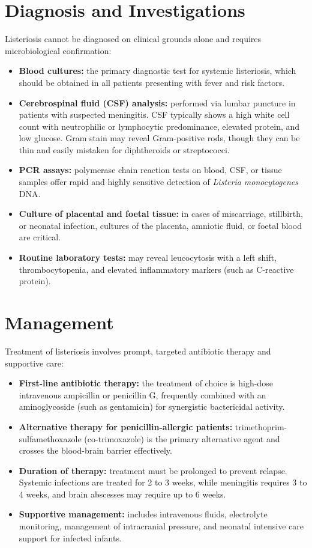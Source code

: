 \section*{Diagnosis and Investigations}
Listeriosis cannot be diagnosed on clinical grounds alone and requires microbiological confirmation:
\begin{itemize}
    \item \textbf{Blood cultures:} the primary diagnostic test for systemic listeriosis, which should be obtained in all patients presenting with fever and risk factors.
    \item \textbf{Cerebrospinal fluid (CSF) analysis:} performed via lumbar puncture in patients with suspected meningitis. CSF typically shows a high white cell count with neutrophilic or lymphocytic predominance, elevated protein, and low glucose. Gram stain may reveal Gram-positive rods, though they can be thin and easily mistaken for diphtheroids or streptococci.
    \item \textbf{PCR assays:} polymerase chain reaction tests on blood, CSF, or tissue samples offer rapid and highly sensitive detection of \textit{Listeria monocytogenes} DNA.
    \item \textbf{Culture of placental and foetal tissue:} in cases of miscarriage, stillbirth, or neonatal infection, cultures of the placenta, amniotic fluid, or foetal blood are critical.
    \item \textbf{Routine laboratory tests:} may reveal leucocytosis with a left shift, thrombocytopenia, and elevated inflammatory markers (such as C-reactive protein).
\end{itemize}

\section*{Management}
Treatment of listeriosis involves prompt, targeted antibiotic therapy and supportive care:
\begin{itemize}
    \item \textbf{First-line antibiotic therapy:} the treatment of choice is high-dose intravenous ampicillin or penicillin G, frequently combined with an aminoglycoside (such as gentamicin) for synergistic bactericidal activity.
    \item \textbf{Alternative therapy for penicillin-allergic patients:} trimethoprim-sulfamethoxazole (co-trimoxazole) is the primary alternative agent and crosses the blood-brain barrier effectively.
    \item \textbf{Duration of therapy:} treatment must be prolonged to prevent relapse. Systemic infections are treated for 2 to 3 weeks, while meningitis requires 3 to 4 weeks, and brain abscesses may require up to 6 weeks.
    \item \textbf{Supportive management:} includes intravenous fluids, electrolyte monitoring, management of intracranial pressure, and neonatal intensive care support for infected infants.
\end{itemize}

